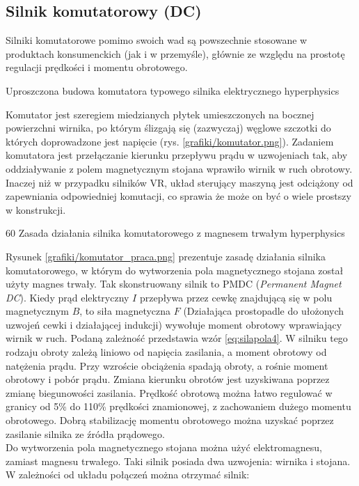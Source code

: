 \subsection{Silnik komutatorowy (DC)}

Silniki komutatorowe pomimo swoich wad są powszechnie stosowane w produktach konsumenckich (jak i w przemyśle), głównie ze względu na prostotę regulacji prędkości i momentu obrotowego.

		{Uproszczona budowa komutatora typowego silnika elektrycznego}
		{hyperphysics}
		
Komutator jest szeregiem miedzianych płytek umieszczonych na bocznej powierzchni wirnika, po którym ślizgają się (zazwyczaj) węglowe szczotki do których doprowadzone jest napięcie (rys. \ref{grafiki/komutator.png}). Zadaniem komutatora jest przełączanie kierunku przepływu prądu w uzwojeniach tak, aby oddziaływanie z polem magnetycznym stojana wprawiło wirnik w ruch obrotowy. Inaczej niż w przypadku silników VR, układ sterujący maszyną jest odciążony od zapewniania odpowiedniej komutacji, co sprawia że może on być o wiele prostszy w konstrukcji. 

		{60}
		{Zasada działania silnika komutatorowego z magnesem trwałym}
		{hyperphysics}
		
Rysunek \ref{grafiki/komutator_praca.png} prezentuje zasadę działania silnika komutatorowego, w którym do wytworzenia pola magnetycznego stojana został użyty magnes trwały. Tak skonstruowany silnik to PMDC ({\it Permanent Magnet DC}). Kiedy prąd elektryczny $ I $ przepływa przez cewkę znajdującą się w polu magnetycznym $ B $, to siła magnetyczna $ F $ (Działająca prostopadle do ułożonych uzwojeń cewki i działającej indukcji)  wywołuje moment obrotowy wprawiający wirnik w ruch. Podaną zależność przedstawia wzór \ref{eq:silapola4}. W silniku tego rodzaju obroty zależą liniowo od napięcia zasilania, a moment obrotowy od natężenia prądu. Przy wzroście obciążenia spadają obroty, a rośnie moment obrotowy i pobór prądu. Zmiana kierunku obrotów jest uzyskiwana poprzez zmianę biegunowości zasilania. Prędkość obrotową można łatwo regulować w granicy od 5\% do 110\% prędkości znamionowej, z zachowaniem dużego momentu obrotowego. Dobrą stabilizację momentu obrotowego można uzyskać poprzez zasilanie silnika ze źródła prądowego. \\

Do wytworzenia pola magnetycznego stojana można użyć elektromagnesu, zamiast magnesu trwałego. Taki silnik posiada dwa uzwojenia: wirnika i stojana. W zależności od układu połączeń można otrzymać silnik:

